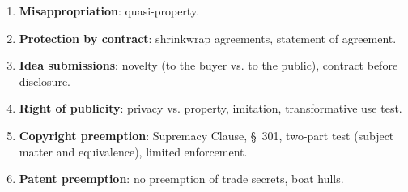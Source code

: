 \begin{enumerate}
    \item \textbf{Misappropriation}: quasi-property.
    \item \textbf{Protection by contract}: shrinkwrap agreements, statement of 
    agreement.
    \item \textbf{Idea submissions}: novelty (to the buyer vs. to the public), 
    contract before disclosure.
    \item \textbf{Right of publicity}: privacy vs. property, imitation, 
    transformative use test.
    \item \textbf{Copyright preemption}: Supremacy Clause, \S\ 301, two-part 
    test (subject matter and equivalence), limited enforcement.
    \item \textbf{Patent preemption}: no preemption of trade secrets, boat 
    hulls.
\end{enumerate}
